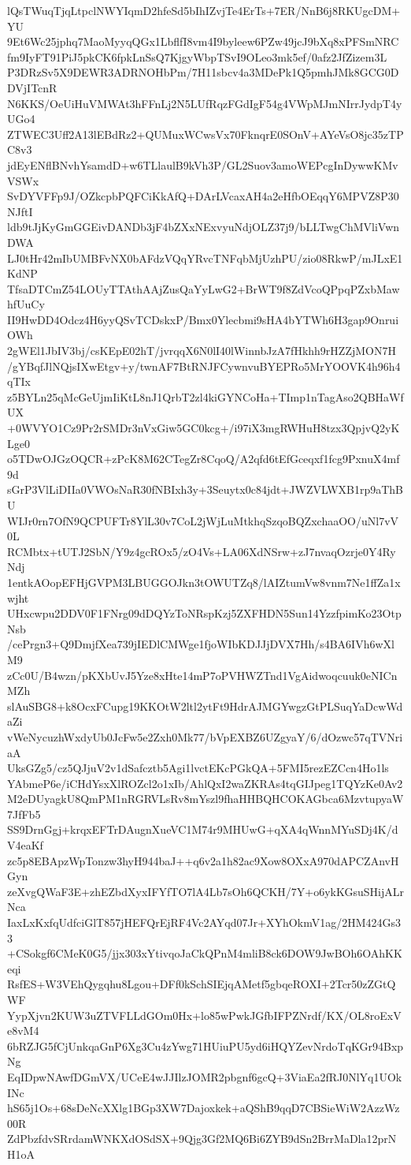 lQsTWuqTjqLtpclNWYIqmD2hfeSd5bIhIZvjTe4ErTs+7ER/NnB6j8RKUgcDM+YU
9Et6Wc25jphq7MaoMyyqQGx1LbflfI8vm4I9byleew6PZw49jcJ9bXq8xPFSmNRC
fm9IyFT91PiJ5pkCK6fpkLnSsQ7KjgyWbpTSvI9OLeo3mk5ef/0afz2JfZizem3L
P3DRzSv5X9DEWR3ADRNOHbPm/7H11sbcv4a3MDePk1Q5pmhJMk8GCG0DDVjITcnR
N6KKS/OeUiHuVMWAt3hFFnLj2N5LUfRqzFGdIgF54g4VWpMJmNIrrJydpT4yUGo4
ZTWEC3Uff2A13lEBdRz2+QUMuxWCwsVx70FknqrE0SOnV+AYeVsO8jc35zTPC8v3
jdEyENflBNvhYsamdD+w6TLlaulB9kVh3P/GL2Suov3amoWEPcgInDywwKMvVSWx
SvDYVFFp9J/OZkcpbPQFCiKkAfQ+DArLVcaxAH4a2eHfbOEqqY6MPVZ8P30NJftI
ldb9tJjKyGmGGEivDANDb3jF4bZXxNExvyuNdjOLZ37j9/bLLTwgChMVliVwnDWA
LJ0tHr42mIbUMBFvNX0bAFdzVQqYRvcTNFqbMjUzhPU/zio08RkwP/mJLxE1KdNP
TfsaDTCmZ54LOUyTTAthAAjZusQaYyLwG2+BrWT9f8ZdVcoQPpqPZxbMawhfUuCy
II9HwDD4Odcz4H6yyQSvTCDskxP/Bmx0Ylecbmi9sHA4bYTWh6H3gap9OnruiOWh
2gWEl1JbIV3bj/csKEpE02hT/jvrqqX6N0lI40lWinnbJzA7fHkhh9rHZZjMON7H
/gYBqfJlNQjsIXwEtgv+y/twnAF7BtRNJFCywnvuBYEPRo5MrYOOVK4h96h4qTIx
z5BYLn25qMcGeUjmIiKtL8nJ1QrbT2zl4kiGYNCoHa+TImp1nTagAso2QBHaWfUX
+0WVYO1Cz9Pr2rSMDr3nVxGiw5GC0kcg+/i97iX3mgRWHuH8tzx3QpjvQ2yKLge0
o5TDwOJGzOQCR+zPcK8M62CTegZr8CqoQ/A2qfd6tEfGceqxf1fcg9PxnuX4mf9d
sGrP3VlLiDIIa0VWOsNaR30fNBIxh3y+3Seuytx0c84jdt+JWZVLWXB1rp9aThBU
WIJr0rn7OfN9QCPUFTr8YlL30v7CoL2jWjLuMtkhqSzqoBQZxchaaOO/uNl7vV0L
RCMbtx+tUTJ2SbN/Y9z4gcROx5/zO4Vs+LA06XdNSrw+zJ7nvaqOzrje0Y4RyNdj
1entkAOopEFHjGVPM3LBUGGOJkn3tOWUTZq8/lAIZtumVw8vnm7Ne1ffZa1xwjht
UHxcwpu2DDV0F1FNrg09dDQYzToNRspKzj5ZXFHDN5Sun14YzzfpimKo23OtpNsb
/cePrgn3+Q9DmjfXea739jIEDlCMWge1fjoWIbKDJJjDVX7Hh/s4BA6IVh6wXlM9
zCc0U/B4wzn/pKXbUvJ5Yze8xHte14mP7oPVHWZTnd1VgAidwoqcuuk0eNICnMZh
slAuSBG8+k8OcxFCupg19KKOtW2ltl2ytFt9HdrAJMGYwgzGtPLSuqYaDcwWdaZi
vWeNycuzhWxdyUb0JcFw5e2Zxh0Mk77/bVpEXBZ6UZgyaY/6/dOzwc57qTVNriaA
UksGZg5/cz5QJjuV2v1dSafcztb5Agi1lvctEKcPGkQA+5FMI5rezEZCcn4Ho1ls
YAbmeP6e/iCHdYsxXlROZcl2o1xIb/AhlQxI2waZKRAs4tqGIJpeg1TQYzKe0Av2
M2eDUyagkU8QmPM1nRGRVLsRv8mYszl9fhaHHBQHCOKAGbca6MzvtupyaW7JfFb5
SS9DrnGgj+krqxEFTrDAugnXueVC1M74r9MHUwG+qXA4qWnnMYuSDj4K/dV4eaKf
zc5p8EBApzWpTonzw3hyH944baJ++q6v2a1h82ac9Xow8OXxA970dAPCZAnvHGyn
zeXvgQWaF3E+zhEZbdXyxIFYfTO7lA4Lb7sOh6QCKH/7Y+o6ykKGsuSHijALrNca
IaxLxKxfqUdfciGlT857jHEFQrEjRF4Vc2AYqd07Jr+XYhOkmV1ag/2HM424Gs33
+CSokgf6CMeK0G5/jjx303xYtivqoJaCkQPnM4mliB8ck6DOW9JwBOh6OAhKKeqi
RsfES+W3VEhQygqhu8Lgou+DFf0kSchSIEjqAMetf5gbqeROXI+2Tcr50zZGtQWF
YypXjvn2KUW3uZTVFLLdGOm0Hx+lo85wPwkJGfbIFPZNrdf/KX/OL8roExVe8vM4
6bRZJG5fCjUnkqaGnP6Xg3Cu4zYwg71HUiuPU5yd6iHQYZevNrdoTqKGr94BxpNg
EqIDpwNAwfDGmVX/UCeE4wJJIlzJOMR2pbgnf6gcQ+3ViaEa2fRJ0NlYq1UOkINc
hS65j1Os+68sDeNcXXlg1BGp3XW7Dajoxkek+aQShB9qqD7CBSieWiW2AzzWz00R
ZdPbzfdvSRrdamWNKXdOSdSX+9Qjg3Gf2MQ6Bi6ZYB9dSn2BrrMaDla12prNH1oA
